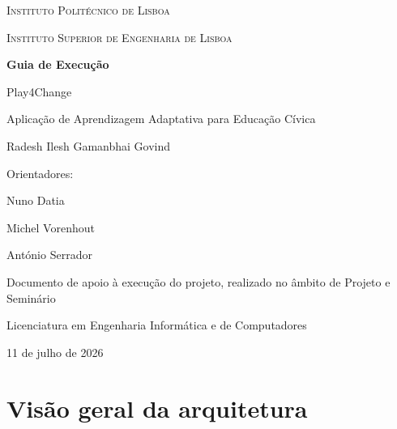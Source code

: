 \documentclass[11pt,a4paper]{article}
\begin{document}
\begin{titlepage}
\centering

{\scshape\large Instituto Politécnico de Lisboa\par}
\vspace{0.2cm}
{\scshape Instituto Superior de Engenharia de Lisboa\par}

\vspace{2.5cm}

{\Huge\bfseries Guia de Execução\par}
\vspace{0.4cm}
{\LARGE Play4Change\par}
\vspace{0.3cm}
{\large Aplicação de Aprendizagem Adaptativa para Educação Cívica\par}

\vspace{2cm}

{\large Radesh Ilesh Gamanbhai Govind\par}

\vspace{1.5cm}

{\large Orientadores:\par}
\vspace{0.2cm}
{\large Nuno Datia\par}
{\large Michel Vorenhout\par}
{\large António Serrador\par}

\vspace{2cm}

{\normalsize Documento de apoio à execução do projeto, realizado no âmbito de Projeto e Seminário\par}
{\normalsize Licenciatura em Engenharia Informática e de Computadores\par}

\vfill

{\large 11 de julho de 2026\par}

\end{titlepage}

\tableofcontents
\newpage

\section{Visão geral da arquitetura}
\end{document}
